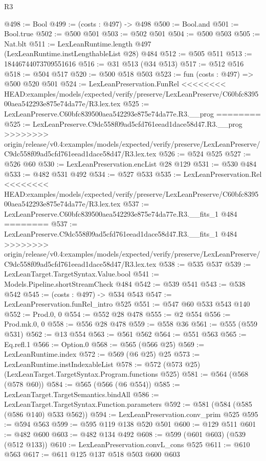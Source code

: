 \begin{lexlean}{R3}
\begin{coremodule}
{{{{{{{{{{{{{{{{{{{{{{{{{{@498 := Bool
@499 := (costs : @497) -> @498
@500 := Bool.and
@501 := Bool.true
@502 := @500 @501
@503 := @502 @501
@504 := @500 @503
@505 := Nat.blt
@511 := LexLeanRuntime.length @497 (LexLeanRuntime.instLengthableList @28) @484
@512 := @505 @511
@513 := 18446744073709551616
@516 := @31 @513 (@34 @513)
@517 := @512 @516
@518 := @504 @517
@520 := @500 @518 @503
@523 := fun (costs : @497) => @500 @520 @501
@524 := LexLeanPreservation.FunRel
<<<<<<<< HEAD:examples/models/expected/verify/preserve/LexLeanPreserve/C60bfc839500aea542293e875e74da77e/R3.lex.tex
@525 := LexLeanPreserve.C60bfc839500aea542293e875e74da77e.R3.__prog
========
@525 := LexLeanPreserve.C9dc558f09ad5cfd761eead1dace58d47.R3.__prog
>>>>>>>> origin/release/v0.4:examples/models/expected/verify/preserve/LexLeanPreserve/C9dc558f09ad5cfd761eead1dace58d47/R3.lex.tex
@526 := @524 @525
@527 := @526 @60
@530 := LexLeanPreservation.encList @28 @129
@531 := @530 @484
@533 := @482 @531 @492
@534 := @527 @533
@535 := LexLeanPreservation.Rel
<<<<<<<< HEAD:examples/models/expected/verify/preserve/LexLeanPreserve/C60bfc839500aea542293e875e74da77e/R3.lex.tex
@537 := LexLeanPreserve.C60bfc839500aea542293e875e74da77e.R3.__fits_1 @484
========
@537 := LexLeanPreserve.C9dc558f09ad5cfd761eead1dace58d47.R3.__fits_1 @484
>>>>>>>> origin/release/v0.4:examples/models/expected/verify/preserve/LexLeanPreserve/C9dc558f09ad5cfd761eead1dace58d47/R3.lex.tex
@538 := @535 @537
@539 := LexLeanTarget.TargetSyntax.Value.bool
@541 := Models.Pipeline.shortStreamCheck @484
@542 := @539 @541
@543 := @538 @542
@545 := (costs : @497) -> @534 @543
@547 := LexLeanPreservation.funRel_intro @525
@551 := @547 @60 @533 @543 @140
@552 := Prod.{0, 0}
@554 := @552 @28 @478
@555 := @2 @554
@556 := Prod.mk.{0, 0}
@558 := @556 @28 @478
@559 := @558 @36
@561 := @555 (@559 @531)
@562 := @13 @554
@563 := @561 @562
@564 := @551 @563
@565 := Eq.refl.{1}
@566 := Option.{0}
@568 := @565 (@566 @25)
@569 := LexLeanRuntime.index
@572 := @569 (@6 @25) @25
@573 := LexLeanRuntime.instIndexableList
@578 := @572 (@573 @25) (LexLeanTarget.TargetSyntax.Program.functions @525)
@581 := @564 (@568 (@578 @60))
@584 := @565 (@566 (@6 @554))
@585 := LexLeanTarget.TargetSemantics.bindAll
@586 := LexLeanTarget.TargetSyntax.Function.parameters
@592 := @581 (@584 (@585 (@586 @140) @533 @562))
@594 := LexLeanPreservation.conv_prim @525
@595 := @594 @563
@599 := @595 @119 @138 @520 @501
@600 := @129 @511
@601 := @482 @600
@603 := @482 @134 @492
@608 := @599 (@601 @603) (@539 (@512 @133))
@610 := LexLeanPreservation.convL_cons @525
@611 := @610 @563
@617 := @611 @125 @137 @518 @503 @600 @603
}}}}}}}}}}}}}}}}}}}}}}}}}}
\end{coremodule}
\end{lexlean}
